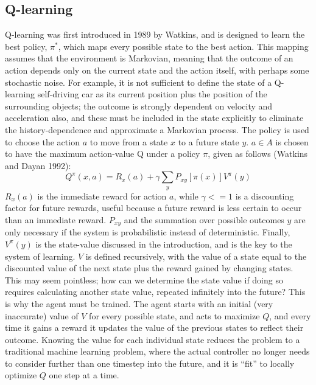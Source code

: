 \documentclass[journal,onecolumn]{IEEEtran}
\begin{document}
\subsection{Q-learning} Q-learning was first introduced in 1989 by Watkins, and is designed to learn the best policy, $\pi^{*}$, which maps every possible state to the best action. This mapping assumes that the environment is Markovian, meaning that the outcome of an action depends only on the current state and the action itself, with perhaps some stochastic noise.  For example, it is not sufficient to define the state of a Q-learning self-driving car as its current position plus the position of the surrounding objects; the outcome is strongly dependent on velocity and acceleration also, and these must be included in the state explicitly to eliminate the history-dependence and approximate a Markovian process.  The policy is used to choose the action $a$ to move from a state $x$ to a future state $y$. $a \in A$ is chosen to have the maximum action-value Q under a policy $\pi$, given as follows (Watkins and Dayan 1992):
\[
{{Q}^{\pi }}(x,a)={{R}_{x}}(a)+\gamma \sum\limits_{y}{{{P}_{xy}}[\pi (x)]{{V}^{\pi }}\left( y \right)}
\]
$R_{x}(a)$ is the immediate reward for action $a$, while $\gamma <= 1$ is a discounting factor for future rewards, useful because a future reward is less certain to occur than an immediate reward.  $P_{xy}$ and the summation over possible outcomes $y$ are only necessary if the system is probabilistic instead of deterministic.  Finally, $V^{\pi}(y)$ is the state-value discussed in the introduction, and is the key to the system of learning.  $V$ is defined recursively, with the value of a state equal to the discounted value of the next state plus the reward gained by changing states.  This may seem pointless; how can we determine the state value if doing so requires calculating another state value, repeated infinitely into the future?  This is why the agent must be trained.  The agent starts with an initial (very inaccurate) value of $V$ for every possible state, and acts to maximize $Q$, and every time it gains a reward it updates the value of the previous states to reflect their outcome.  Knowing the value for each individual state reduces the problem to a traditional machine learning problem, where the actual controller no longer needs to consider further than one timestep into the future, and it is “fit” to locally optimize $Q$ one step at a time. \\\\
\end{document}
